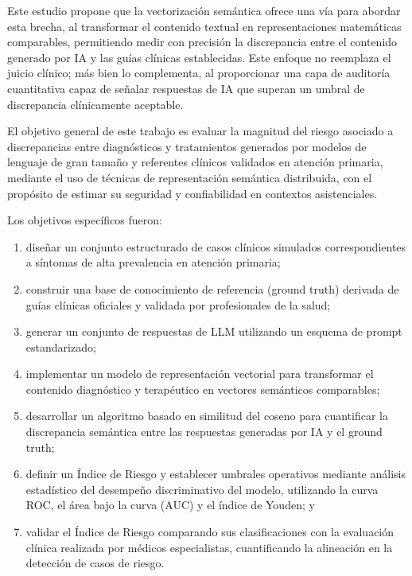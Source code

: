 \documentclass[final,11pt,3p]{elsarticle}
\begin{document}
Este estudio propone que la vectorización semántica ofrece una vía para abordar esta brecha, al transformar el contenido textual en representaciones matemáticas comparables, permitiendo medir con precisión la discrepancia entre el contenido generado por IA y las guías clínicas establecidas. Este enfoque no reemplaza el juicio clínico; más bien lo complementa, al proporcionar una capa de auditoría cuantitativa capaz de señalar respuestas de IA que superan un umbral de discrepancia clínicamente aceptable.

El objetivo general de este trabajo es evaluar la magnitud del riesgo asociado a discrepancias entre diagnósticos y tratamientos generados por modelos de lenguaje de gran tamaño y referentes clínicos validados en atención primaria, mediante el uso de técnicas de representación semántica distribuida, con el propósito de estimar su seguridad y confiabilidad en contextos asistenciales.

Los objetivos específicos fueron:

\begin{enumerate}
    \item diseñar un conjunto estructurado de casos clínicos simulados correspondientes a síntomas de alta prevalencia en atención primaria;
    
    \item construir una base de conocimiento de referencia (ground truth) derivada de guías clínicas oficiales y validada por profesionales de la salud;
    
    \item generar un conjunto de respuestas de LLM utilizando un esquema de prompt estandarizado;
    
    \item implementar un modelo de representación vectorial para transformar el contenido diagnóstico y terapéutico en vectores semánticos comparables;
    
    \item desarrollar un algoritmo basado en similitud del coseno para cuantificar la discrepancia semántica entre las respuestas generadas por IA y el ground truth;
    
    \item definir un Índice de Riesgo y establecer umbrales operativos mediante análisis estadístico del desempeño discriminativo del modelo, utilizando la curva ROC, el área bajo la curva (AUC) y el índice de Youden; y
    
    \item validar el Índice de Riesgo comparando sus clasificaciones con la evaluación clínica realizada por médicos especialistas, cuantificando la alineación en la detección de casos de riesgo.
\end{enumerate}
\end{document}
